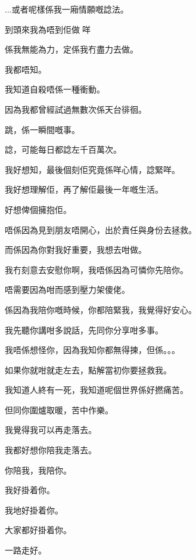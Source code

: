 ...或者呢樣係我一廂情願嘅諗法。

到頭來我為唔到佢做咩

係我無能為力，定係我冇盡力去做。

我都唔知。

我知道自殺唔係一種衝動。

因為我都曾經試過無數次係天台徘徊。

跳，係一瞬間嘅事。

諗，可能每日都諗左千百萬次。

我好想知，最後個刻佢究竟係咩心情，諗緊咩。

我好想理解佢，再了解佢最後一年嘅生活。

好想俾個擁抱佢。

唔係因為見到朋友唔開心，出於責任與身份去拯救。

而係因為你對我好重要，我想去咁做。

我冇刻意去安慰你啊，我唔係因為可憐你先陪你。

唔需要因為咁而感到壓力架傻佬。

係因為我陪你嘅時候，你都陪緊我，我覺得好安心。

我先聽你講咁多說話，先同你分享咁多事。

我唔係想怪你，因為我知你都無得揀，但係。。。

如果你就咁就走左去，點解當初你要拯救我。

我知道人終有一死，我知道呢個世界係好撚痛苦。

但同你圍爐取暖，苦中作樂。

我覺得我可以再走落去。

我都好想你陪我走落去。

你陪我，我陪你。

我好掛着你。

我地好掛着你。

大家都好掛着你。

一路走好。

